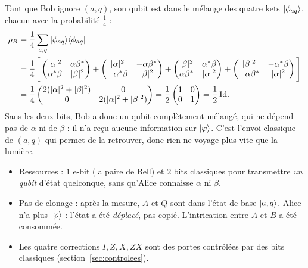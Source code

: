 Tant que Bob ignore $(a,q)$, son qubit est dans le mélange des quatre kets $|\phi_{aq}\rangle$, chacun
avec la probabilité $\frac14$ :
\begin{align*}
  \rho_B&=\frac14\sum_{a,q}|\phi_{aq}\rangle\langle \phi_{aq}|\\
  &=\frac14\Bigg[\begin{pmatrix}|\alpha|^2&\alpha\beta^*\\ \alpha^*\beta&|\beta|^2\end{pmatrix}
    +\begin{pmatrix}|\alpha|^2&-\alpha\beta^*\\ -\alpha^*\beta&|\beta|^2\end{pmatrix}
    +\begin{pmatrix}|\beta|^2&\alpha^*\beta\\ \alpha\beta^*&|\alpha|^2\end{pmatrix}
    +\begin{pmatrix}|\beta|^2&-\alpha^*\beta\\ -\alpha\beta^*&|\alpha|^2\end{pmatrix}\Bigg]\\
  &=\frac14\begin{pmatrix}2(|\alpha|^2+|\beta|^2)&0\\0&2(|\alpha|^2+|\beta|^2)\end{pmatrix}
   =\frac12\begin{pmatrix}1&0\\0&1\end{pmatrix}=\frac12\,\mathrm{Id}.
\end{align*}
Sans les deux bits, Bob a donc un qubit complètement mélangé, qui ne dépend pas de $\alpha$ ni de
$\beta$ : il n'a reçu aucune information sur $|\varphi\rangle$. C'est l'envoi classique de $(a,q)$
qui permet de la retrouver, donc rien ne voyage plus vite que la lumière.

\begin{remarque}
\begin{itemize}[nosep]
  \item Ressources : $1$ e-bit (la paire de Bell) et $2$ bits classiques pour transmettre
        \emph{un qubit} d'état quelconque, sans qu'Alice connaisse $\alpha$ ni $\beta$.
  \item Pas de clonage : après la mesure, $A$ et $Q$ sont dans l'état de base $|a,q\rangle$.
        Alice n'a plus $|\varphi\rangle$ : l'état a été \emph{déplacé}, pas copié. L'intrication
        entre $A$ et $B$ a été consommée.
  \item Les quatre corrections $I,Z,X,ZX$ sont des portes contrôlées par des bits classiques
        (section~\ref{sec:controlees}).
\end{itemize}
\end{remarque}

